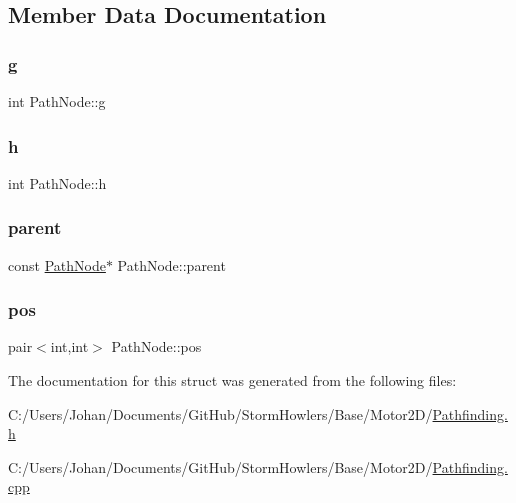 \subsection{Member Data Documentation}
\mbox{\label{struct_path_node_a97de9a75f550007643f5df2629d207de}} 
\subsubsection{\texorpdfstring{g}{g}}
{\footnotesize\ttfamily int Path\+Node\+::g}

\mbox{\label{struct_path_node_a87bfefc8a3eac26d0de524bf03a43d31}} 
\subsubsection{\texorpdfstring{h}{h}}
{\footnotesize\ttfamily int Path\+Node\+::h}

\mbox{\label{struct_path_node_a6f659ad1091d0f1dfe18c55114d5f6be}} 
\subsubsection{\texorpdfstring{parent}{parent}}
{\footnotesize\ttfamily const \mbox{\hyperlink{struct_path_node}{Path\+Node}}$\ast$ Path\+Node\+::parent}

\mbox{\label{struct_path_node_a942fdbe2451e6bc1ecd921c7083f7b69}} 
\subsubsection{\texorpdfstring{pos}{pos}}
{\footnotesize\ttfamily pair$<$int,int$>$ Path\+Node\+::pos}



The documentation for this struct was generated from the following files\+:\begin{DoxyCompactItemize}
\item 
C\+:/\+Users/\+Johan/\+Documents/\+Git\+Hub/\+Storm\+Howlers/\+Base/\+Motor2\+D/\mbox{\hyperlink{_pathfinding_8h}{Pathfinding.\+h}}\item 
C\+:/\+Users/\+Johan/\+Documents/\+Git\+Hub/\+Storm\+Howlers/\+Base/\+Motor2\+D/\mbox{\hyperlink{_pathfinding_8cpp}{Pathfinding.\+cpp}}\end{DoxyCompactItemize}
